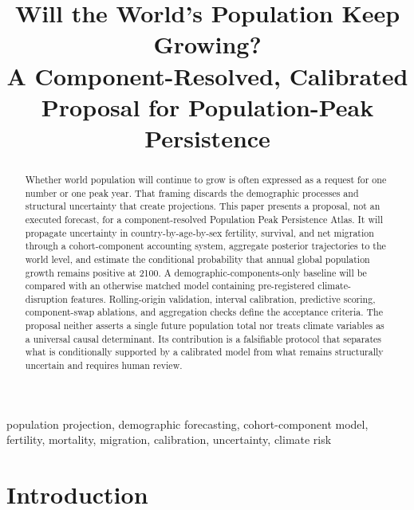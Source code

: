 \documentclass[conference]{IEEEtran}
\begin{document}
\title{Will the World's Population Keep Growing?\\
A Component-Resolved, Calibrated Proposal for Population-Peak Persistence}

\author{
}

\maketitle

\begin{abstract}
Whether world population will continue to grow is often expressed as a request for one number or one peak year. That framing discards the demographic processes and structural uncertainty that create projections. This paper presents a proposal, not an executed forecast, for a component-resolved Population Peak Persistence Atlas. It will propagate uncertainty in country-by-age-by-sex fertility, survival, and net migration through a cohort-component accounting system, aggregate posterior trajectories to the world level, and estimate the conditional probability that annual global population growth remains positive at 2100. A demographic-components-only baseline will be compared with an otherwise matched model containing pre-registered climate-disruption features. Rolling-origin validation, interval calibration, predictive scoring, component-swap ablations, and aggregation checks define the acceptance criteria. The proposal neither asserts a single future population total nor treats climate variables as a universal causal determinant. Its contribution is a falsifiable protocol that separates what is conditionally supported by a calibrated model from what remains structurally uncertain and requires human review.
\end{abstract}

\begin{IEEEkeywords}
population projection, demographic forecasting, cohort-component model, fertility, mortality, migration, calibration, uncertainty, climate risk
\end{IEEEkeywords}

\section{Introduction}
\end{document}
